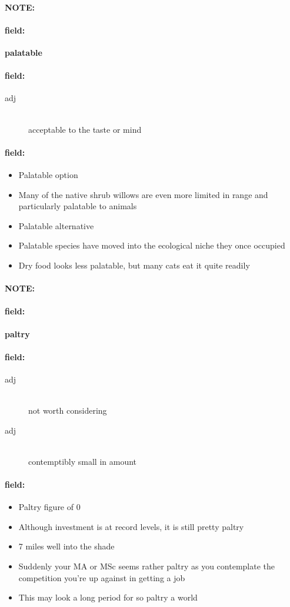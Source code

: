 \documentclass[12pt]{article}
\newenvironment{note}{\paragraph{NOTE:}}{}
\newenvironment{field}{\paragraph{field:}}{}
\begin{document}
\begin{note}
\begin{field}
\textbf{\large palatable}
\end{field}


\begin{field}
\begin{description}
\item[adj] \hfill \\ 
acceptable to the taste or mind

\end{description}
\end{field}

\begin{field}
\begin{itemize}
\item Palatable option
\item Many of the native shrub willows are even more limited in range and particularly palatable to animals
\item Palatable alternative
\item Palatable species have moved into the ecological niche they once occupied
\item Dry food looks less palatable, but many cats eat it quite readily
\end{itemize}
\end{field}
\end{note}
\begin{note}
\begin{field}
\textbf{\large paltry}
\end{field}


\begin{field}
\begin{description}
\item[adj] \hfill \\ 
not worth considering

\item[adj] \hfill \\ 
contemptibly small in amount

\end{description}
\end{field}

\begin{field}
\begin{itemize}
\item Paltry figure of 0
\item Although investment is at record levels, it is still pretty paltry
\item 7 miles well into the shade
\item Suddenly your MA or MSc seems rather paltry as you contemplate the competition you're up against in getting a job
\item This may look a long period for so paltry a world
\end{itemize}
\end{field}
\end{note}
\end{document}
